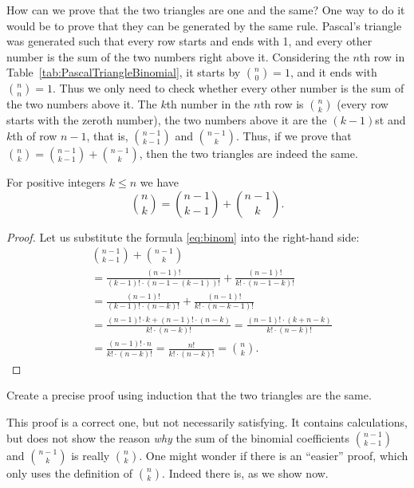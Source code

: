 How can we prove that the two triangles are one and the same? 
One way to do it would be to prove that they can be generated by the same rule. 
Pascal's triangle was generated such that every row starts and ends with 1, 
and every other number is the sum of the two numbers right above it. 
Considering the $n$th row in Table~\ref{tab:PascalTriangleBinomial}, 
it starts by $\binom{n}{0}=1$, and it ends with $\binom{n}{n} = 1$. 
Thus we only need to check whether every other number is the sum of the two numbers above it. 
The $k$th number in the $n$th row is $\binom{n}{k}$ (every row starts with the zeroth number), 
the two numbers above it are the $(k-1)$st and $k$th of row $n-1$, 
that is, $\binom{n-1}{k-1}$ and $\binom{n-1}{k}$. 
Thus, if we prove that $\binom{n}{k} = \binom{n-1}{k-1} + \binom{n-1}{k}$, 
then the two triangles are indeed the same. 

\begin{proposition}\label{prop:binomsum}
For positive integers $k\leq n$ we have 
\[
\binom{n}{k} = \binom{n-1}{k-1} + \binom{n-1}{k}.
\]
\end{proposition}

\begin{proof}
Let us substitute the formula \eqref{eq:binom} into the right-hand side:
\begin{align*}
&{ } \binom{n-1}{k-1} + \binom{n-1}{k} \\
&= \frac{(n-1)!}{(k-1)! \cdot (n-1-(k-1))!} + \frac{(n-1)!}{k! \cdot (n-1-k)!} \\
&= \frac{(n-1)!}{(k-1)! \cdot (n-k)!} + \frac{(n-1)!}{k! \cdot (n-k-1)!} \\
&= \frac{(n-1)!\cdot k + (n-1)! \cdot (n-k)}{k! \cdot (n-k)!} = \frac{(n-1)!\cdot (k + n-k)}{k! \cdot (n-k)!}\\
&= \frac{(n-1)!\cdot n}{k! \cdot (n-k)!} = \frac{n!}{k! \cdot (n-k)!} = \binom{n}{k}.
\end{align*}
\end{proof}

\begin{exercise}\label{ex:pascalbinomialsame}
Create a precise proof using induction that the two triangles are the same. 
\end{exercise}

This proof is a correct one, 
but not necessarily satisfying. 
It contains calculations, 
but does not show the reason \emph{why} the sum of the binomial coefficients 
$\binom{n-1}{k-1}$ and $\binom{n-1}{k}$ is really $\binom{n}{k}$. 
One might wonder if there is an ``easier'' proof, 
which only uses the definition of $\binom{n}{k}$. 
Indeed there is, as we show now. 

